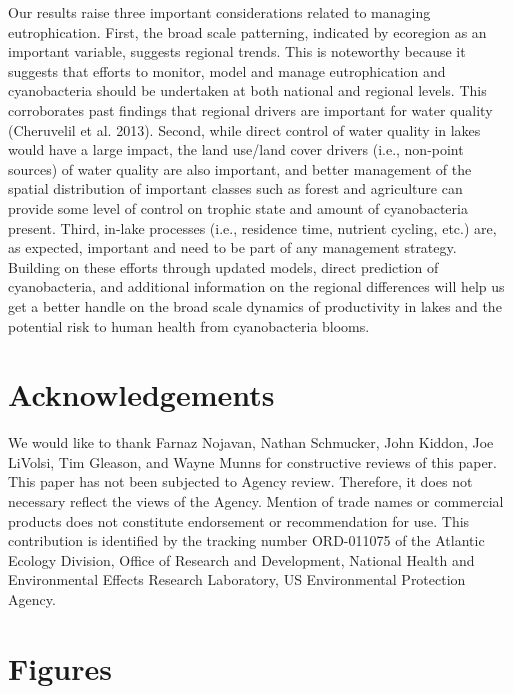 \documentclass[12pt,]{article}
\begin{document}
Our results raise three important considerations related to managing
eutrophication. First, the broad scale patterning, indicated by
ecoregion as an important variable, suggests regional trends. This is
noteworthy because it suggests that efforts to monitor, model and manage
eutrophication and cyanobacteria should be undertaken at both national
and regional levels. This corroborates past findings that regional
drivers are important for water quality (Cheruvelil et al. 2013).
Second, while direct control of water quality in lakes would have a
large impact, the land use/land cover drivers (i.e., non-point sources)
of water quality are also important, and better management of the
spatial distribution of important classes such as forest and agriculture
can provide some level of control on trophic state and amount of
cyanobacteria present. Third, in-lake processes (i.e., residence time,
nutrient cycling, etc.) are, as expected, important and need to be part
of any management strategy. Building on these efforts through updated
models, direct prediction of cyanobacteria, and additional information
on the regional differences will help us get a better handle on the
broad scale dynamics of productivity in lakes and the potential risk to
human health from cyanobacteria blooms.

\section{Acknowledgements}\label{acknowledgements}

We would like to thank Farnaz Nojavan, Nathan Schmucker, John Kiddon,
Joe LiVolsi, Tim Gleason, and Wayne Munns for constructive reviews of
this paper. This paper has not been subjected to Agency review.
Therefore, it does not necessary reflect the views of the Agency.
Mention of trade names or commercial products does not constitute
endorsement or recommendation for use. This contribution is identified
by the tracking number ORD-011075 of the Atlantic Ecology Division,
Office of Research and Development, National Health and Environmental
Effects Research Laboratory, US Environmental Protection Agency.

\newpage

\section{Figures}\label{figures}
\end{document}
